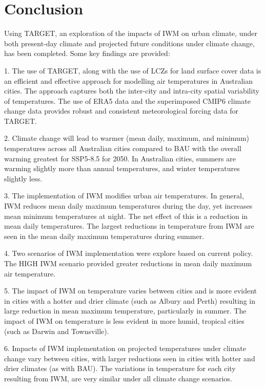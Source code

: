 \documentclass[utf8]{frontiersSCNS} %
\begin{document}
\section{Conclusion}\label{sec:conclusion}


Using TARGET, an exploration of the impacts of IWM on urban climate, under both present-day climate and projected future conditions under climate change, has been completed. Some key findings are provided:

1. The use of TARGET, along with the use of LCZs for land surface cover data is an efficient and effective approach for modelling air temperatures in Australian cities. The approach captures both the inter-city and intra-city spatial variability of temperatures. The use of ERA5 data and the superimposed CMIP6 climate change data provides robust and consistent meteorological forcing data for TARGET.

2. Climate change will lead to warmer (mean daily, maximum, and minimum) temperatures across all Australian cities compared to BAU with the overall warming greatest for SSP5-8.5 for 2050. In Australian cities, summers are warming slightly more than annual temperatures, and winter temperatures slightly less.

3. The implementation of IWM modifies urban air temperatures. In general, IWM reduces mean daily maximum temperatures during the day, yet increases mean minimum temperatures at night. The net effect of this is a reduction in mean daily temperatures. The largest reductions in temperature from IWM are seen in the mean daily maximum temperatures during summer. 

4. Two scenarios of IWM implementation were explore based on current policy. The HIGH IWM scenario provided greater reductions in mean daily maximum air temperature. 

5. The impact of IWM on temperature varies between cities and is more evident in cities with a hotter and drier climate (such as Albury and Perth) resulting in large reduction in mean maximum temperature, particularly in summer. The impact of IWM on temperature is less evident in more humid, tropical cities (such as Darwin and Townsville). 

6. Impacts of IWM implementation on projected temperatures under climate change vary between cities, with larger reductions seen in cities with hotter and drier climates (as with BAU). The variations in temperature for each city resulting from IWM, are very similar under all climate change scenarios. 
\end{document}
